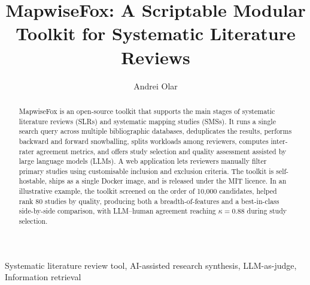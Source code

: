 \documentclass[preprint,12pt, a4paper]{elsarticle}
\begin{document}
\renewcommand{\labelenumii}{\arabic{enumi}.\arabic{enumii}}

\begin{frontmatter}

  \title{MapwiseFox: A Scriptable Modular Toolkit for Systematic Literature Reviews}

  \author{Andrei Olar}

  \address{Universitatea Babe\c{s}-Bolyai, Facultatea de Matematic\u{a}
  \c{s}i Informatic\u{a}, Str. M. Kog\u{a}lniceanu 1, Cluj-Napoca, Rom\^{a}nia}


  \begin{abstract}
    MapwiseFox is an open-source toolkit that supports the main stages of
    systematic literature reviews (SLRs) and systematic mapping studies (SMSs). It runs
    a single search query across multiple bibliographic databases, deduplicates
    the results, performs backward and forward snowballing, splits workloads
    among reviewers, computes inter-rater agreement metrics, and offers
    study selection and quality assessment assisted by large language models (LLMs).
    A web application lets reviewers manually filter primary studies using
    customisable inclusion and exclusion criteria. The toolkit is self-hostable, ships
    as a single Docker image, and is released under the MIT licence. In an illustrative
    example, the toolkit screened on the order of 10{,}000 candidates, helped rank 80
    studies by quality, producing both a breadth-of-features and a best-in-class
    side-by-side comparison, with LLM--human agreement reaching $\kappa = 0.88$ during
    study selection.
  \end{abstract}

  \begin{keyword}
    Systematic literature review tool\sep
    AI-assisted research synthesis\sep
    LLM-as-judge\sep
    Information retrieval
  \end{keyword}

\end{frontmatter}
\end{document}
